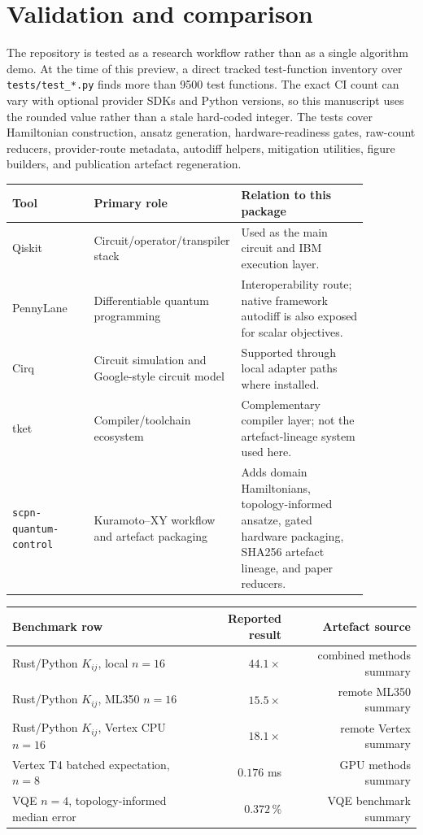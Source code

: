 \documentclass[11pt]{article}
\begin{document}
\section*{Validation and comparison}

The repository is tested as a research workflow rather than as a single
algorithm demo. At the time of this preview, a direct tracked test-function
inventory over \texttt{tests/test\_*.py} finds more than 9500 test functions.
The exact CI count can vary with optional provider SDKs and Python versions,
so this manuscript uses the rounded value rather than a stale hard-coded
integer. The tests cover Hamiltonian construction, ansatz generation,
hardware-readiness gates, raw-count reducers, provider-route metadata,
autodiff helpers, mitigation utilities, figure builders, and publication
artefact regeneration.

\begin{center}
\small
\begin{tabular}{p{0.23\linewidth}p{0.28\linewidth}p{0.36\linewidth}}
\hline
Tool & Primary role & Relation to this package \\
\hline
Qiskit & Circuit/operator/transpiler stack & Used as the main circuit and IBM execution layer. \\
PennyLane & Differentiable quantum programming & Interoperability route; native framework autodiff is also exposed for scalar objectives. \\
Cirq & Circuit simulation and Google-style circuit model & Supported through local adapter paths where installed. \\
tket & Compiler/toolchain ecosystem & Complementary compiler layer; not the artefact-lineage system used here. \\
\texttt{scpn-quantum-control} & Kuramoto--XY workflow and artefact packaging & Adds domain Hamiltonians, topology-informed ansatze, gated hardware packaging, SHA256 artefact lineage, and paper reducers. \\
\hline
\end{tabular}
\end{center}

\begin{center}
\small
\begin{tabular}{lrr}
\hline
Benchmark row & Reported result & Artefact source \\
\hline
Rust/Python $K_{ij}$, local $n=16$ & $44.1\times$ & combined methods summary \\
Rust/Python $K_{ij}$, ML350 $n=16$ & $15.5\times$ & remote ML350 summary \\
Rust/Python $K_{ij}$, Vertex CPU $n=16$ & $18.1\times$ & remote Vertex summary \\
Vertex T4 batched expectation, $n=8$ & $0.176$ ms & GPU methods summary \\
VQE $n=4$, topology-informed median error & $0.372\,\%$ & VQE benchmark summary \\
\hline
\end{tabular}
\end{center}
\end{document}
